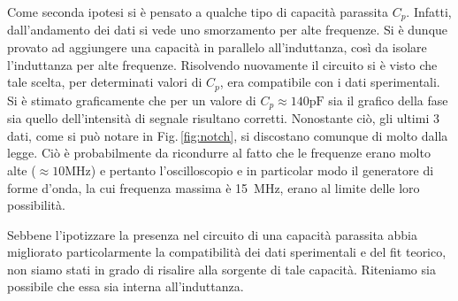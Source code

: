 Come seconda ipotesi si è pensato a qualche tipo di capacità parassita $C_p$. Infatti, dall'andamento dei dati si vede uno smorzamento per alte frequenze. Si è dunque provato ad aggiungere una capacità in parallelo all'induttanza, così da isolare l'induttanza per alte frequenze. Risolvendo nuovamente il circuito si è visto che tale scelta, per determinati valori di $C_p$, era compatibile con i dati sperimentali. Si è stimato graficamente che per un valore di $C_p \approx 140 \si{\pico\farad}$ sia il grafico della fase sia quello dell'intensità di segnale risultano corretti. Nonostante ciò, gli ultimi 3 dati, come si può notare in Fig.$\,$\ref{fig:notch}, si discostano comunque di molto dalla legge. Ciò è probabilmente da ricondurre al fatto che le frequenze erano molto alte ($\approx 10 \si{\mega\hertz}$) e pertanto l'oscilloscopio e in particolar modo il generatore di forme d'onda, la cui frequenza massima è \SI{15}{\mega\hertz}, erano al limite delle loro possibilità.

Sebbene l'ipotizzare la presenza nel circuito di una capacità parassita abbia migliorato particolarmente la compatibilità dei dati sperimentali e del fit teorico, non siamo stati in grado di risalire alla sorgente di tale capacità. Riteniamo sia possibile che essa sia interna all'induttanza.